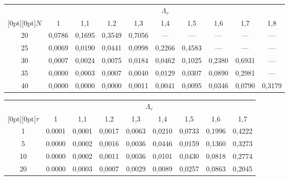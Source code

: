\begin{table}
\begin{center}
\tabcolsep=8pt
\begin{tabular}{|c|c|c|c|c|c|c|c|c|c|}
\hline
&\multicolumn{9}{c|}{$\Lambda_v$}\\
\cline{2-10}
\multicolumn{1}{|c|}{\raisebox{4pt}[0pt][0pt]{$N$}}&1&1{,}1&1{,}2&1{,}3&1{,}4&1{,}5&1{,}6&1{,}7&1{,}8\\
\hline
20&0,0786&0,1695&0,3549&0,7056&---&---&---&---&---\\
25&0,0069&0,0190&0,0441&0,0998&0,2266&0,4583&---&---&---\\
30&0,0007&0,0024&0,0075&0,0184&0,0462&0,1025&0,2380&0,6931&---\\
35&0,0000&0,0003&0,0007&0,0040&0,0129&0,0307&0,0890&0,2981&---\\
40&0,0000&0,0000&0,0000&0,0011&0,0041&0,0095&0,0346&0,0790&0,3179\\
\hline
\end{tabular}
\end{center}
\vspace*{6pt}
\begin{center}
\parbox{356pt}{
}

\vspace*{2ex}

\tabcolsep=8pt
\begin{tabular}{|c|c|c|c|c|c|c|c|c|}
\hline
&\multicolumn{8}{c|}{$\Lambda_v$}\\
\cline{2-9}
\multicolumn{1}{|c|}{\raisebox{6pt}[0pt][0pt]{$\tau$}}&1&1{,}1&1{,}2&1{,}3&1{,}4&1{,}5&1{,}6&1{,}7\\
\hline
\hphantom{9}1&0.0001&0,0001&0,0017&0,0063&0,0210&0,0733&0,1996&0,4222\\
\hphantom{9}5&0.0000&0,0002&0,0016&0,0036&0,0446&0,0159&0,1360&0,3273\\
10&0.0000&0,0002&0,0011&0,0036&0,0101&0,0430&0,0818&0,2774\\
20&0.0000&0,0003&0,0007&0,0029&0,0089&0,0257&0,0863&0,2045\\
     \hline
\end{tabular}
\end{center}
\end{table}


